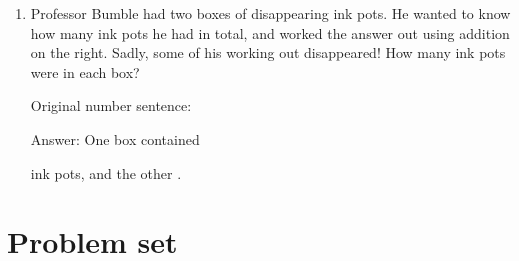 \documentclass{tufte-book}
\providecommand{\tabularnewline}{\\}
\begin{document}
\begin{enumerate}
\item Professor Bumble had two boxes of disappearing ink pots. He wanted to know how many
ink pots he had in total, and worked the answer out using addition on the right.
Sadly, some of his working out disappeared! How many ink pots were in each box?\medskip\par
\marginnote{
\large
\begin{tabular}{ccc}
2 & \texttt{\_} & \quad{}\tabularnewline
\texttt{\_} & 7 & +\tabularnewline
\bottomrule
3 & 9 & \tabularnewline
\end{tabular}
}

\medskip Original number sentence: \dotfill\medskip

Answer: One box contained
\dotfill\medskip\par
ink pots, and the other \dotfill\medskip.

\end{enumerate}

\clearpage\section{Problem set }
\end{document}
